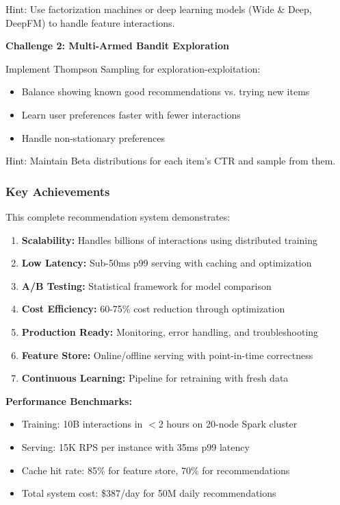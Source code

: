 Hint: Use factorization machines or deep learning models (Wide \& Deep, DeepFM) to handle
feature interactions.

\textbf{Challenge 2: Multi-Armed Bandit Exploration}

Implement Thompson Sampling for exploration-exploitation:
\begin{itemize}
    \item Balance showing known good recommendations vs. trying new items
    \item Learn user preferences faster with fewer interactions
    \item Handle non-stationary preferences
\end{itemize}

Hint: Maintain Beta distributions for each item's CTR and sample from them.

\subsubsection*{Key Achievements}

This complete recommendation system demonstrates:

\begin{enumerate}
    \item \textbf{Scalability:} Handles billions of interactions using distributed training
    \item \textbf{Low Latency:} Sub-50ms p99 serving with caching and optimization
    \item \textbf{A/B Testing:} Statistical framework for model comparison
    \item \textbf{Cost Efficiency:} 60-75\% cost reduction through optimization
    \item \textbf{Production Ready:} Monitoring, error handling, and troubleshooting
    \item \textbf{Feature Store:} Online/offline serving with point-in-time correctness
    \item \textbf{Continuous Learning:} Pipeline for retraining with fresh data
\end{enumerate}

\textbf{Performance Benchmarks:}
\begin{itemize}
    \item Training: 10B interactions in $<$2 hours on 20-node Spark cluster
    \item Serving: 15K RPS per instance with 35ms p99 latency
    \item Cache hit rate: 85\% for feature store, 70\% for recommendations
    \item Total system cost: \$387/day for 50M daily recommendations
\end{itemize}

